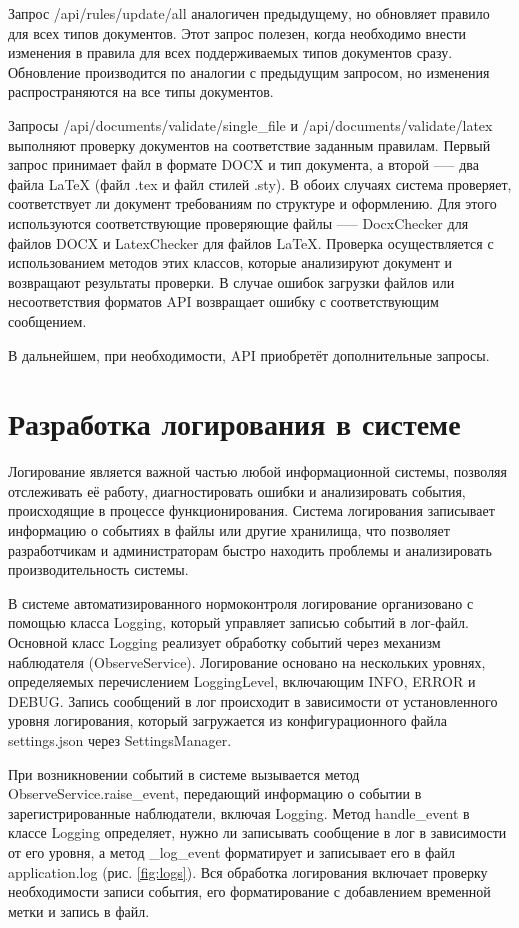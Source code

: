 \documentclass{report}
\begin{document}
Запрос /api/rules/update/all аналогичен предыдущему, но обновляет правило для всех типов документов. Этот запрос полезен, когда необходимо внести изменения в правила для всех поддерживаемых типов документов сразу. Обновление производится по аналогии с предыдущим запросом, но изменения распространяются на все типы документов.

Запросы /api/documents/validate/single\_file и /api/documents/validate/latex выполняют проверку документов на соответствие заданным правилам. Первый запрос принимает файл в формате DOCX и тип документа, а \break второй --— два файла LaTeX (файл .tex и файл стилей .sty). В обоих случаях система проверяет, соответствует ли документ требованиям по структуре и оформлению. Для этого используются соответствующие проверяющие \break файлы —-- DocxChecker для файлов DOCX и LatexChecker для файлов LaTeX. Проверка осуществляется с использованием методов этих классов, которые анализируют документ и возвращают результаты проверки. В случае ошибок загрузки файлов или несоответствия форматов API возвращает ошибку с соответствующим сообщением.

В дальнейшем, при необходимости, API приобретёт дополнительные запросы.

\section{Разработка логирования в системе}


Логирование является важной частью любой информационной системы, позволяя отслеживать её работу, диагностировать ошибки и анализировать события, происходящие в процессе функционирования. Система логирования записывает информацию о событиях в файлы или другие хранилища, что позволяет разработчикам и администраторам быстро находить проблемы и анализировать производительность системы.

В системе автоматизированного нормоконтроля логирование организовано с помощью класса Logging, который управляет записью событий в лог-файл. Основной класс Logging реализует обработку событий через механизм наблюдателя (ObserveService). Логирование основано на нескольких уровнях, определяемых перечислением LoggingLevel, включающим INFO, ERROR и DEBUG. Запись сообщений в лог происходит в зависимости от установленного уровня логирования, который загружается из конфигурационного файла settings.json через SettingsManager.

При возникновении событий в системе вызывается метод ObserveService.raise\_event, передающий информацию о событии в зарегистрированные наблюдатели, включая Logging. Метод handle\_event в классе Logging определяет, нужно ли записывать сообщение в лог в зависимости от его уровня, а метод \_log\_event форматирует и записывает его в файл application.log (рис. \ref{fig:logs}). Вся обработка логирования включает проверку необходимости записи события, его форматирование с добавлением временной метки и запись в файл.
\end{document}
